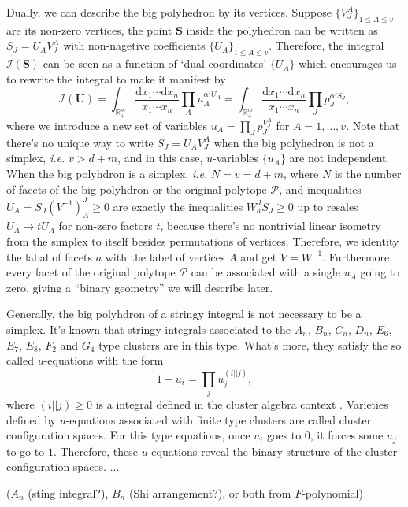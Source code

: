 \documentclass[hidelinks,12pt]{article}
\begin{document}
Dually, we can describe the big polyhedron by its vertices. Suppose 
$\{V_J^A\}_{1\leq A\leq v}$ are its non-zero vertices, the point $\mathbf S$ inside 
the polyhedron can be written as $S_J = U_A V^A_J$ with non-nagetive coefficients 
$\{U_A\}_{1\leq A\leq v}$.  Therefore, the integral $\mathcal I(\mathbf S)$
can be seen as a function of `dual coordinates' $\{U_A\}$ which encourages us to 
rewrite the integral to make it manifest by
\[
	\mathcal I(\mathbf U)=
	\int_{\mathbb R_+^m}\frac{\mathrm d x_1\cdots \mathrm d x_n}{x_1\cdots x_n}
	\prod_{A}u_A^{\alpha' U_A}
	=
	\int_{\mathbb R_+^m}\frac{\mathrm d x_1\cdots \mathrm d x_n}{x_1\cdots x_n}
	\prod_{J}p_J^{\alpha' S_J},
\]
where we introduce a new set of variables $u_A = \prod_J p_J^{V_J^A}$ for 
$A=1,\dots,v$. Note that there's no unique way to write $S_J=U_AV_J^A$ when
the big polyhedron is not a simplex, \textit{i.e.} $v>d+m$, and in this case,
$u$-variables $\{u_A\}$ are not independent. 
When the big polyhdron is a simplex, \textit{i.e.} $N=v=d+m$, where $N$ is 
the number of facets of the big polyhdron or the original polytope $\mathcal P$,
and inequalities $U_A=S_J(V^{-1})^J_A\geq 0$ are exactly the inequalities
$W_a^J S_J\geq 0$ up to resales $U_A\mapsto t U_A$ for non-zero factors $t$, because
there's no nontrivial linear isometry from the simplex to itself besides permutations
of vertices. Therefore, we identity the labal of facets $a$ with the label of 
vertices $A$ and get $V=W^{-1}$. Furthermore, every facet of the original polytope
$\mathcal P$ can be associated with a single $u_A$ going to zero, 
giving a ``binary geometry'' we will describe later.

Generally, the big polyhdron of a stringy integral is not necessary to be a simplex.
It's known that stringy integrals associated to the $A_n$, $B_n$, $C_n$, $D_n$,
$E_6$, $E_7$, $E_8$, $F_2$ and $G_4$ type clusters are in this type. What's more,
they satisfy the so called $u$-equations with the form
\begin{equation}\label{perfectu}
	1-u_i=\prod_{j}u_j^{(i||j)},
\end{equation}
where $(i||j)\geq 0$ is a integral defined in the cluster algebra context \cite{}.
Varieties defined by $u$-equations associated with finite type clusters 
are called cluster configuration spaces. 
For this type equations, once $u_i$ goes to $0$, it forces some $u_j$ to go to $1$.
Therefore, these $u$-equations reveal the binary structure of the cluster
configuration spaces. ...

($A_n$ (sting integral?), $B_n$ (Shi arrangement?), or both from $F$-polynomial)
\end{document}
